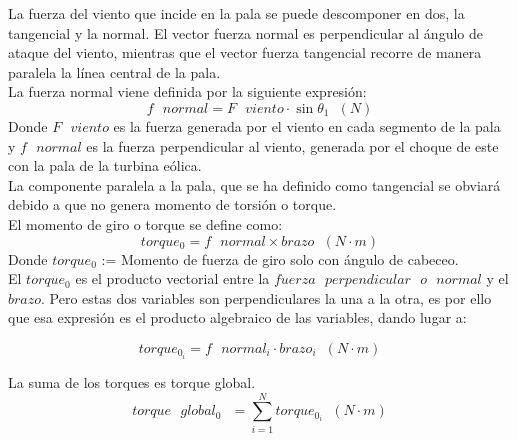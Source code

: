 La fuerza del viento que incide en la pala se puede descomponer en dos, la tangencial y la normal. El vector fuerza normal es perpendicular al ángulo de ataque del viento, mientras que el vector fuerza tangencial recorre de manera paralela la línea central de la pala.\\

 La fuerza normal viene definida por la siguiente expresión:
 \begin{equation}
   f \text{ } normal = F \text{ } viento \cdot \sin{\theta_1} \hspace{7pt} (N)
 \label{def:fuerza_normal}
 \end{equation}
 Donde $F \text{ } viento$ es la fuerza generada por el viento en cada segmento de la pala y $f \text{ } normal$ es la fuerza perpendicular al viento, generada por el choque de este con la pala de la turbina eólica.\\


La componente paralela a la pala, que se ha definido como tangencial se obviará debido a que no genera momento de torsión o torque.\\
  
El momento de giro o torque se define como:
  \begin{equation}
  torque_0 = f \text{ } normal \times brazo \hspace{7pt} (N \cdot m)
  \label{def:torque_inicial}
 \end{equation}
 Donde $torque_0$ := Momento de fuerza de giro solo con ángulo de cabeceo.\\


El $torque_0$ es el producto vectorial entre la $fuerza  \text{ }perpendicular \text{ } o \text{ } normal$ y el $brazo$. Pero estas dos variables son perpendiculares la una a la otra, es por ello que esa expresión es el producto algebraico de las variables, dando lugar a:
 
 
  \begin{equation}
  torque_{0_i} = f \text{ } normal_i \cdot brazo_i \hspace{7pt} (N \cdot m)
 \label{def:torque_algebraico_inicial}
 \end{equation}
 
 La suma de los torques es torque global.
 \begin{equation}
  torque \text{ } global_0 \text{ } = \sum_{i=1}^{N} torque_{0_i} \hspace{7pt} (N \cdot m)
\label{def:torque_global}
\end{equation}
 
